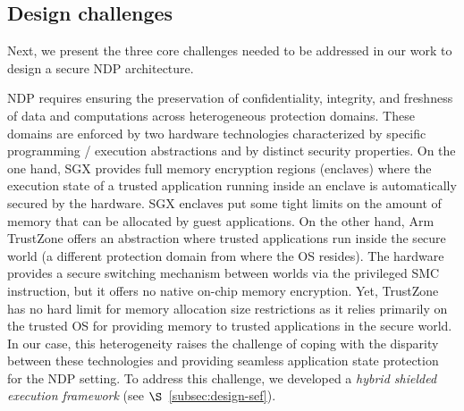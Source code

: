 



\subsection{Design challenges}
\label{subsect:design-challenges}

Next, we present the three core challenges needed to be addressed in our work to design a secure NDP architecture.

 NDP requires ensuring the preservation of confidentiality, integrity, and freshness of data and computations across heterogeneous protection domains. These domains are enforced by two hardware technologies characterized by specific programming / execution abstractions and by distinct security properties. On the one hand, SGX provides full memory encryption regions (enclaves) where the execution state of a trusted application running inside an enclave is automatically secured by the hardware. SGX enclaves put some tight limits on the amount of memory that can be allocated by guest applications. On the other hand, Arm TrustZone offers an abstraction where trusted applications run inside the secure world (a different protection domain from where the OS resides). The hardware provides a secure switching mechanism between worlds via the privileged SMC instruction, but it offers no native on-chip memory encryption. Yet, TrustZone has no hard limit for memory allocation size restrictions as it relies primarily on the trusted OS for providing memory to trusted applications in the secure world. In our case, this heterogeneity raises the challenge of coping with the disparity between these technologies and providing seamless application state protection for the NDP setting. To address this challenge, we developed a \textit{hybrid shielded execution framework} (see $\S$~\ref{subsec:design-sef}).
\fi

